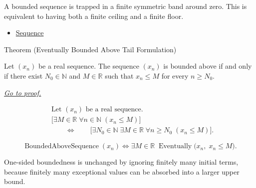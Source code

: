 \begin{remark*}[Interpretation]
A bounded sequence is trapped in a finite symmetric band around zero. This is
equivalent to having both a finite ceiling and a finite floor.
\end{remark*}

\begin{dependencies}
\begin{itemize}
  \item \hyperref[def:sequence]{Sequence}
\end{itemize}
\end{dependencies}


\begin{theorembox}{Theorem (Eventually Bounded Above Tail Formulation)}
\begin{theorem}
\label{thm:eventually-bounded-above-tail-formulation}
Let $(x_n)$ be a real sequence. The sequence $(x_n)$ is bounded above if and
only if there exist $N_0 \in \mathbb{N}$ and $M \in \mathbb{R}$ such that
$x_n \le M$ for every $n \ge N_0$.

\smallskip
\noindent
\hyperref[prf:eventually-bounded-above-tail-formulation]{\textit{Go to proof.}}
\end{theorem}
\end{theorembox}

\begin{remark*}
\[
\begin{aligned}
&\text{Let } (x_n) \text{ be a real sequence.}\\
&\bigl[
\exists M \in \mathbb{R}\;
\forall n \in \mathbb{N}\;(x_n \le M)
\bigr]\\
&\qquad\Longleftrightarrow\qquad
\bigl[
\exists N_0 \in \mathbb{N}\;
\exists M \in \mathbb{R}\;
\forall n \ge N_0\;(x_n \le M)
\bigr].
\end{aligned}
\]
\end{remark*}

\begin{remark*}
\[
\operatorname{BoundedAboveSequence}(x_n)
\Longleftrightarrow
\exists M \in \mathbb{R}\;
\operatorname{Eventually}\bigl(x_n,\; x_n \le M\bigr).
\]
\end{remark*}

\begin{remark*}[Interpretation]
One-sided boundedness is unchanged by ignoring finitely many initial terms,
because finitely many exceptional values can be absorbed into a larger upper
bound.
\end{remark*}

